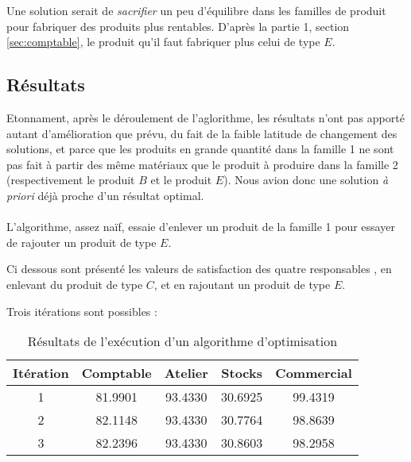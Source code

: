 Une solution serait de \emph{sacrifier} un peu d'équilibre dans les familles de
produit pour fabriquer des produits plus rentables. D'après la partie 1, section 
\ref{sec:comptable}, le produit qu'il faut fabriquer plus celui de type $E$.

\subsection{Résultats}
Etonnament, après le déroulement de l'aglorithme, les résultats n'ont pas apporté autant d'amélioration que prévu,
du fait de la faible latitude de changement des solutions, et parce que les produits en grande quantité dans la
famille 1 ne sont pas fait à partir des même matériaux que le produit à produire
dans la famille 2 (respectivement le produit $B$ et le produit $E$). Nous avion donc une solution \textsl{à priori} 
déjà proche d'un résultat optimal.\\
~\\
L'algorithme, assez naïf, essaie d'enlever un produit de la famille 1 pour
essayer de rajouter un produit de type $E$.

Ci dessous sont présenté les valeurs de satisfaction des quatre responsables ,
   en enlevant du produit de type $C$, et en rajoutant un produit de type $E$.

   Trois itérations sont possibles :
   \begin{table}[ht!]
   \begin{center}
\begin{tabular}{|c|c|c|c|c|}
\hline
    Itération & Comptable & Atelier & Stocks & Commercial \\
	\hline
1 &   81.9901 & 93.4330 & 30.6925 & 99.4319 \\
       \hline
2&   82.1148 & 93.4330 & 30.7764 & 98.8639 \\
       \hline
  3&  82.2396 & 93.4330 & 30.8603 & 98.2958 \\
       \hline

\end{tabular}
\end{center}
\caption{Résultats de l'exécution d'un algorithme d'optimisation}
\end{table}

